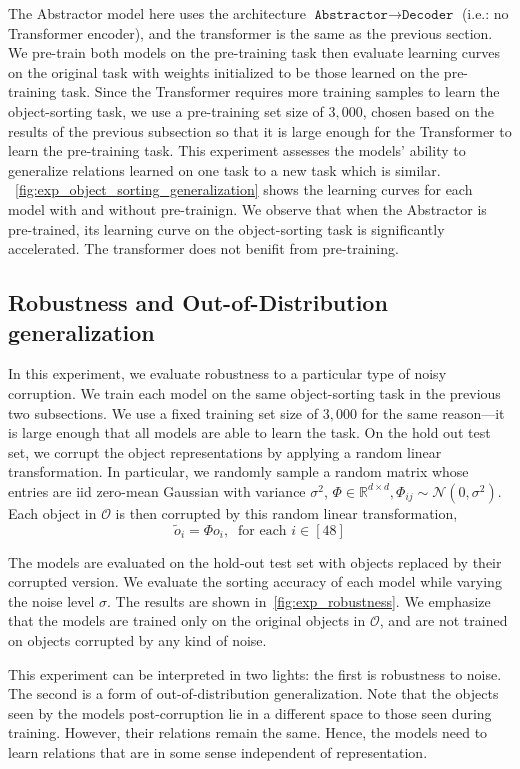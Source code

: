 The Abstractor model here uses the architecture $\texttt{Abstractor} \to \texttt{Decoder}$ (i.e.: no Transformer encoder), and the transformer is the same as the previous section. We pre-train both models on the pre-training task then evaluate learning curves on the original task with weights initialized to be those learned on the pre-training task. Since the Transformer requires more training samples to learn the object-sorting task, we use a pre-training set size of $3,000$, chosen based on the results of the previous subsection so that it is large enough for the Transformer to learn the pre-training task. This experiment assesses the models' ability to generalize relations learned on one task to a new task which is similar. ~\cref{fig:exp_object_sorting_generalization} shows the learning curves for each model with and without pre-trainign. We observe that when the Abstractor is pre-trained, its learning curve on the object-sorting task is significantly accelerated. The transformer does not benifit from pre-training.

\subsection{Robustness and Out-of-Distribution generalization}
In this experiment, we evaluate robustness to a particular type of noisy corruption. We train each model on the same object-sorting task in the previous two subsections. We use a fixed training set size of $3,000$ for the same reason---it is large enough that all models are able to learn the task. On the hold out test set, we corrupt the object representations by applying a random linear transformation. In particular, we randomly sample a random matrix whose entries are iid zero-mean Gaussian with variance $\sigma^2$, $\Phi \in \mathbb{R}^{d \times d}, \Phi_{ij} \sim \mathcal{N}(0, \sigma^2)$. Each object in $\mathcal{O}$ is then corrupted by this random linear transformation,
\[\tilde{o}_i = \Phi o_i, \ \text{ for each } i \in [48]\]

The models are evaluated on the hold-out test set with objects replaced by their corrupted version. We evaluate the sorting accuracy of each model while varying the noise level $\sigma$. The results are shown in~\cref{fig:exp_robustness}. We emphasize that the models are trained only on the original objects in $\mathcal{O}$, and are not trained on objects corrupted by any kind of noise.

This experiment can be interpreted in two lights: the first is robustness to noise. The second is a form of out-of-distribution generalization. Note that the objects seen by the models post-corruption lie in a different space to those seen during training. However, their relations remain the same. Hence, the models need to learn relations that are in some sense independent of representation.

